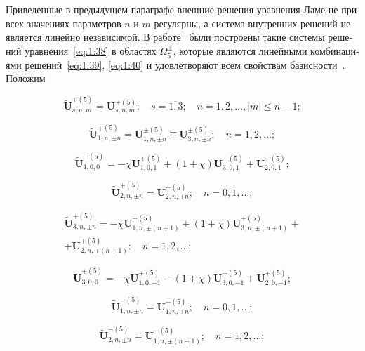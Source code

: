 \begin{russian}
Приведенные в предыдущем параграфе внешние решения уравнения Ламе не при всех значениях параметров $n$ и $m$ регулярны, а система внутренних решений не является линейно независимой. В работе~\cite{Nikolaev1993} были построены такие системы решений уравнения~\eqref{eq:1:38} в областях $\Omega_5^{\pm}$, которые являются линейными комбинациями решений~\eqref{eq:1:39}, \eqref{eq:1:40} и удовлетворяют всем свойствам базисности~\cite{Nikolaev1998}. Положим

\begin{equation}\label{eq:1:89a}
\mathbf{\tilde U}_{s,n,m}^{\pm(5)}=\mathbf{U}_{s,n,m}^{\pm(5)};\quad s=\overline{1,3};\quad n=1,2,\dots, |m|\le n-1;
\end{equation}

\begin{equation}\label{eq:1:90a}
\mathbf{\tilde U}_{1,n,\pm n}^{+(5)}=\mathbf{U}_{1,n,\pm n}^{\pm(5)}\mp\mathbf{U}_{3,n,\pm n}^{\pm(5)};\quad n=1,2,\dots;
\end{equation}

\begin{equation}\label{eq:1:91a}
\mathbf{\tilde U}_{1,0,0}^{+(5)}=-\chi\mathbf{U}_{1,0,1}^{+(5)}+(1+\chi)\mathbf{U}_{3,0,1}^{+(5)}+\mathbf{U}_{2,0,1}^{+(5)};
\end{equation}

\begin{equation}\label{eq:1:92a}
\mathbf{\tilde U}_{2,n,\pm n}^{+(5)}=\mathbf{U}_{2,n,\pm n}^{+(5)};\quad n=0,1,\dots;
\end{equation}

\begin{multline}\label{eq:1:93a}
\mathbf{\tilde U}_{3,n,\pm n}^{+(5)}=-\chi\mathbf{U}_{1,n,\pm (n+1)}^{+(5)}\pm(1+\chi)\mathbf{U}_{3,n,\pm (n+1)}^{+(5)}+ \\
+\mathbf{U}_{2,n,\pm (n+1)}^{+(5)};\quad n=1,2,\dots;
\end{multline}

\begin{equation}\label{eq:1:94a}
\mathbf{\tilde U}_{3,0,0}^{+(5)}=-\chi\mathbf{U}_{1,0,-1}^{+(5)}-(1+\chi)\mathbf{U}_{3,0,-1}^{+(5)}+\mathbf{U}_{2,0,-1}^{+(5)};
\end{equation}

\begin{equation}\label{eq:1:95a}
\mathbf{\tilde U}_{1,n,\pm n}^{-(5)}=\mathbf{U}_{1,n,\pm n}^{-(5)};\quad n=0,1,\dots;
\end{equation}

\begin{equation}\label{eq:1:96a}
\mathbf{\tilde U}_{2,n,\pm n}^{-(5)}=\mathbf{U}_{1,n,\pm (n+1)}^{-(5)};\quad n=1,2,\dots;
\end{equation}


\end{russian}
